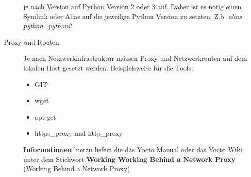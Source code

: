 \begin{description}
        je nach Version auf Python Version 2 oder 3 auf. Daher ist es nötig einen
        Symlink  oder Alias auf die jeweilige Python Version zu setzten.
        Z.b. \textit{alias python=python2}
    \item[Proxy und Routen]
    Je nach Netzwerkinfrastruktur müssen Proxy und Netzwerkrouten auf
    dem lokalen Host gesetzt werden. Beispielsweise für die Tools:
        \begin{itemize}
            \item GIT
            \item wget
            \item apt-get
            \item https\_proxy und http\_proxy
        \end{itemize}
        \textbf{Informationen} hierzu liefert die das Yocto Manual oder das
            Yocto Wiki unter dem Stichwort \glqq \textbf{Working Working Behind
            a Network Proxy} \grqq (Working Behind a Network Proxy)

\end{description}

